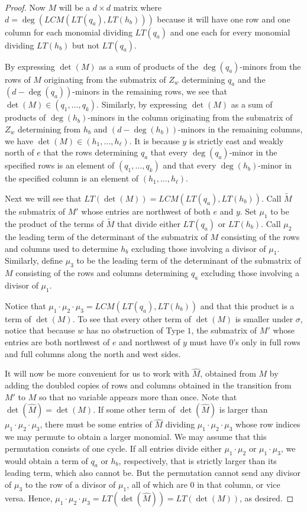 \begin{proof}
Now $M$ will be a $d \times d$ matrix where $d = \deg(LCM(LT(q_a),LT(h_b)))$ because it will have one row and one column for each monomial dividing $LT(q_a)$ and one each for every monomial dividing $LT(h_b)$ but not $LT(q_a)$.  

By expressing $\det(M)$ as a sum of products of the $\deg(q_a)$-minors from the rows of $M$ originating from the submatrix of $Z_w$ determining $q_a$ and the $(d-\deg(q_a))$-minors in the remaining rows, we see that $\det(M) \in (q_1, \ldots, q_k)$.  Similarly, by expressing $\det(M)$ as a sum of products of $\deg(h_b)$-minors in the column originating from the submatrix of $Z_w$ determining from $h_b$ and $(d-\deg(h_b))$-minors in the remaining columns, we have $\det(M) \in (h_1, \ldots, h_\ell)$.  It is because $y$ is strictly east and weakly north of $e$ that the rows determining $q_a$ that every $\deg(q_a)$-minor in the specified rows is an element of $(q_1, \ldots, q_k)$ and that every $\deg(h_b)$-minor in the specified column is an element of $(h_1, \ldots, h_\ell)$.

Next we will see that $LT(\det(M)) = LCM(LT(q_a),LT(h_b))$.  Call $\tilde{M}$ the submatrix of $M'$ whose entries are northwest of both $e$ and $y$.  Set $\mu_1$ to be the product of the terms of $\tilde{M}$ that divide either $LT(q_a)$ or $LT(h_b)$.  Call $\mu_2$ the leading term of the determinant of the submatrix of $M$ consisting of the rows and columns used to determine $h_b$ excluding those involving a divisor of $\mu_1$.  Similarly, define $\mu_3$ to be the leading term of the determinant of the submatrix of $M$ consisting of the rows and columns determining $q_a$ excluding those involving a divisor of $\mu_1$.  

Notice that $\mu_1 \cdot \mu_2 \cdot \mu_3 = LCM(LT(q_a),LT(h_b))$ and that this product is a term of $\det(M)$.  To see that every other term of $\det(M)$ is smaller under $\sigma$, notice that because $w$ has no obstruction of Type $1$, the submatrix of $M'$ whose entries are both northwest of $e$ and northwest of $y$ must have $0$'s only in full rows and full columns along the north and west sides.  

It will now be more convenient for us to work with $\widehat{M}$, obtained from $M$ by adding the doubled copies of rows and columns obtained in the transition from $M'$ to $M$ so that no variable appears more than once.  Note that $\det(\widehat{M}) = \det(M)$.  If some other term of $\det(\widehat{M})$ is larger than $\mu_1 \cdot \mu_2 \cdot \mu_3$, there must be some entries of $\widehat{M}$ dividing $\mu_1 \cdot \mu_2 \cdot \mu_3$ whose row indices we may permute to obtain a larger monomial.  We may assume that this permutation consists of one cycle.  If all entries divide either $\mu_1 \cdot \mu_2$ or $\mu_1\cdot \mu_3$, we would obtain a term of $q_a$ or $h_b$, respectively, that is strictly larger than its leading term, which also cannot be.  But the permutation cannot send any divisor of $\mu_3$ to the row of a divisor of $\mu_1$, all of which are $0$ in that column, or vice versa.  Hence, $\mu_1 \cdot \mu_2 \cdot \mu_3 = LT(\det(\widehat{M})) = LT(\det(M))$, as desired.


\end{proof}
